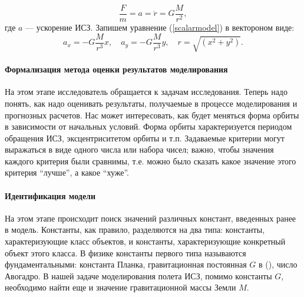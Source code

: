\documentclass[12pt, openany, twoside]{book} %
\begin{document}
\begin{equation}
 \frac{F}{m} = a = \ddot r = G\frac{M}{r^2}, \label{scalarmodel}
\end{equation}
где $a$ --- ускорение ИСЗ. Запишем уравнение (\ref{scalarmodel}) в вектороном виде:
\begin{equation}
 	a_x = - G\frac{M}{r^3}x, \quad a_y = - G\frac{M}{r^3}y, \quad r=\sqrt{(x^2+y^2)}. \label{projectedmodel}
\end{equation}

\paragraph{Формализация метода оценки результатов моделирования} На этом этапе исследователь обращается к задачам исследования. Теперь надо понять, как надо оценивать результаты, получаемые в процессе моделирования и прогнозных расчетов. Нас может интересовать, как будет меняться форма орбиты в зависимости от начальных условий. Форма орбиты характеризуется периодом обращения ИСЗ, эксцентриситетом орбиты и т.п. Задаваемые критерии могут выражаться в виде одного числа или набора чисел; важно, чтобы значения каждого критерия были сравнимы, т.е. можно было сказать какое значение этого критерия ``лучше'', а какое ``хуже''.

\paragraph{Идентификация модели} На этом этапе происходит поиск значений различных констант, введенных ранее в модель. Константы, как правило, разделяются на два типа: константы, характеризующие класс объектов, и константы, характеризующие конкретный объект этого класса. В физике константы первого типа называются фундаментальными: константа Планка, гравитационная постоянная $G$ в (\cite{newton}), число Авогадро. В нашей задаче моделирования полета ИСЗ, помимо константы $G$, необходимо найти еще и значение гравитационной массы Земли $M$.
\end{document}
